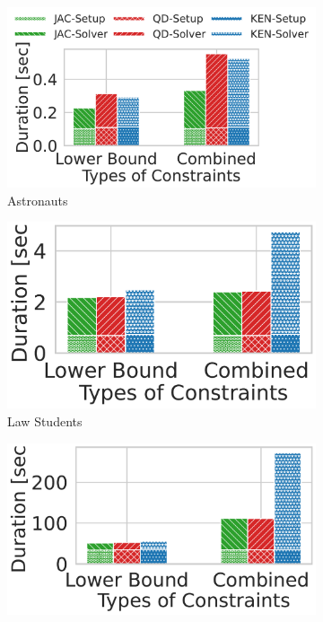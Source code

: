 \begin{figure}[t]
    \begin{subfigure}{.35\textwidth}
      \centering
      \includegraphics[width=.87\linewidth]{figures/astr_const_type.pdf}
      \hspace{-0.65cm}
      \caption{Astronauts}
      \label{fig:r17}
    \end{subfigure}
    \begin{subfigure}{.35\textwidth}
      \centering
      \includegraphics[width=.75\linewidth]{figures/law_const_type.pdf}
      \caption{Law Students}
      \label{fig:r18}
    \end{subfigure}
    \begin{subfigure}{.35\textwidth}
      \centering
      \includegraphics[width=.75\linewidth]{figures/meps_const_type.pdf}

\end{subfigure}
\end{figure}
